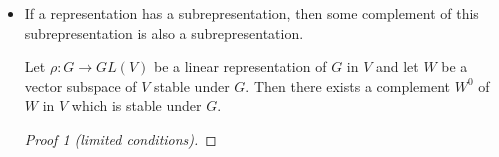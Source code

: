 \documentclass[../notes.tex]{subfiles}
\begin{document}
\begin{itemize}
\begin{itemize}
    \end{itemize}
    \item If a representation has a subrepresentation, then some complement of this subrepresentation is also a subrepresentation.
    \begin{theorem}\label{trm:complements}
        Let $\rho:G\to GL(V)$ be a linear representation of $G$ in $V$ and let $W$ be a vector subspace of $V$ stable under $G$. Then there exists a complement $W^0$ of $W$ in $V$ which is stable under $G$.
        \begin{proof}[Proof 1 (limited conditions)]


\end{proof}
\end{theorem}
\end{itemize}
\end{document}
